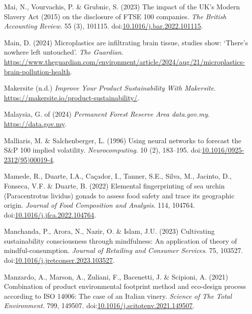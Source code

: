 \documentclass[
  letterpaper,
  DIV=11,
  numbers=noendperiod]{scrartcl}
\newlength{\cslhangindent}
\newenvironment{CSLReferences}[2] %
 {\begin{list}{}{%
  \setlength{\itemindent}{0pt}
  \setlength{\leftmargin}{0pt}
  \setlength{\parsep}{0pt}
  \ifodd #1
   \setlength{\leftmargin}{\cslhangindent}
   \setlength{\itemindent}{-1\cslhangindent}
  \fi
  \setlength{\itemsep}{#2\baselineskip}}}
 {\end{list}}
\begin{document}
\begin{CSLReferences}{0}{1}
Mai, N., Vourvachis, P. \& Grubnic, S. (2023) The impact of the {UK}'s
{Modern Slavery Act} (2015) on the disclosure of {FTSE} 100 companies.
\emph{The British Accounting Review}. 55 (3), 101115.
doi:\href{https://doi.org/10.1016/j.bar.2022.101115}{10.1016/j.bar.2022.101115}.

Main, D. (2024) Microplastics are infiltrating brain tissue, studies
show: {`{There}'s nowhere left untouched'}. \emph{The Guardian}.
\url{https://www.theguardian.com/environment/article/2024/aug/21/microplastics-brain-pollution-health}.

Makersite (n.d.) \emph{Improve {Your Product Sustainability With
Makersite}}. \url{https://makersite.io/product-sustainability/}.

Malaysia, G. of (2024) \emph{Permanent {Forest Reserve Area} {\textbar}
data.gov.my}. \url{https://data.gov.my}.

Malliaris, M. \& Salchenberger, L. (1996) Using neural networks to
forecast the {S}\&{P} 100 implied volatility. \emph{Neurocomputing}. 10
(2), 183--195.
doi:\href{https://doi.org/10.1016/0925-2312(95)00019-4}{10.1016/0925-2312(95)00019-4}.

Mamede, R., Duarte, I.A., Caçador, I., Tanner, S.E., Silva, M., Jacinto,
D., Fonseca, V.F. \& Duarte, B. (2022) Elemental fingerprinting of sea
urchin ({Paracentrotus} lividus) gonads to assess food safety and trace
its geographic origin. \emph{Journal of Food Composition and Analysis}.
114, 104764.
doi:\href{https://doi.org/10.1016/j.jfca.2022.104764}{10.1016/j.jfca.2022.104764}.

Manchanda, P., Arora, N., Nazir, O. \& Islam, J.U. (2023) Cultivating
sustainability consciousness through mindfulness: {An} application of
theory of mindful-consumption. \emph{Journal of Retailing and Consumer
Services}. 75, 103527.
doi:\href{https://doi.org/10.1016/j.jretconser.2023.103527}{10.1016/j.jretconser.2023.103527}.

Manzardo, A., Marson, A., Zuliani, F., Bacenetti, J. \& Scipioni, A.
(2021) Combination of product environmental footprint method and
eco-design process according to {ISO} 14006: {The} case of an {Italian}
vinery. \emph{Science of The Total Environment}. 799, 149507.
doi:\href{https://doi.org/10.1016/j.scitotenv.2021.149507}{10.1016/j.scitotenv.2021.149507}.


\end{CSLReferences}
\end{document}
